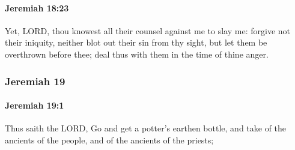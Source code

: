 		\paragraph{Jeremiah 18:23} %
			\label{JEREMIAH-18-23}

			Yet, LORD, thou knowest all their counsel against me to slay me: forgive not their iniquity, neither blot out their sin from thy sight, but let them be overthrown before thee; deal thus with them in the time of thine anger.

	\subsubsection{Jeremiah 19} %
		\label{JEREMIAH-19}

		\paragraph{Jeremiah 19:1} %
			\label{JEREMIAH-19-1}

			Thus saith the LORD, Go and get a potter’s earthen bottle, and take of the ancients of the people, and of the ancients of the priests;

